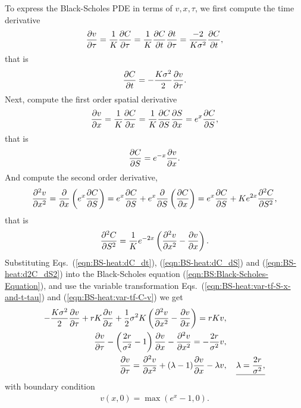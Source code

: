 \documentclass{book}
\begin{document}
To express the Black-Scholes PDE in terms of $v, x, \tau$, we first compute the time derivative
\begin{align*}
    \pdv{v}{\tau} = \frac{1}{K}\pdv{C}{\tau} 
    = \frac{1}{K}\pdv{C}{t}\pdv{t}{\tau}
    = \frac{-2}{K\sigma^2}\pdv{C}{t},
\end{align*}
that is 
\begin{align}
    \label{eqn:BS-heat:dC_dt}
    \pdv{C}{t} = -\frac{K\sigma^2}{2} \pdv{v}{\tau}.
\end{align}
Next, compute the first order spatial derivative
\begin{align*}
    \pdv{v}{x} = \frac{1}{K} \pdv{C}{x}
    = \frac{1}{K} \pdv{C}{S}\pdv{S}{x}
    = e^{x} \pdv{C}{S},
\end{align*}
that is
\begin{align}
    \label{eqn:BS-heat:dC_dS}
    \pdv{C}{S} = e^{-x} \pdv{v}{x}.
\end{align}
And compute the second order derivative,
\begin{align*}
    \pdv[2]{v}{x} = \pdv{}{x}\left(e^{x} \pdv{C}{S}\right)
    = e^{x}\pdv{C}{S} + e^{x} \pdv{}{S}\left( \pdv{C}{x} \right)
    = e^{x}\pdv{C}{S} + K e^{2x} \pdv[2]{C}{S},
\end{align*}
that is 
\begin{align}
    \label{eqn:BS-heat:d2C_dS2}
    \pdv[2]{C}{S} = \frac{1}{K}e^{-2x}\left(\pdv[2]{v}{x} - \pdv{v}{x}\right).
\end{align}
Substituting Eqs.~(\ref{eqn:BS-heat:dC_dt}), (\ref{eqn:BS-heat:dC_dS}) and (\ref{eqn:BS-heat:d2C_dS2}) into the Black-Scholes equation (\ref{eqn:BS:Black-Scholes-Equation}), and use the variable transformation Eqs.~(\ref{eqn:BS-heat:var-tf-S-x-and-t-tau}) and (\ref{eqn:BS-heat:var-tf-C-v}) we get
\begin{align}
    -\frac{K\sigma^2}{2} \pdv{v}{\tau} + r K \pdv{v}{x} +\frac{1}{2}\sigma^2 K\left(\pdv[2]{v}{x} - \pdv{v}{x}\right) = rKv &, \notag\\
    \pdv{v}{\tau} - \left(\frac{2r}{\sigma^2} - 1\right)  \pdv{v}{x} - \pdv[2]{v}{x} = - \frac{2r}{\sigma^2}v &, \notag\\
    \label{eqn:BS-heat:PDE-of-v}
    \pdv{v}{\tau} = \pdv[2]{v}{x} + (\lambda - 1) \pdv{v}{x} - \lambda v &, \quad \underline{\lambda = \frac{2r}{\sigma^2},}
\end{align}
with boundary condition
\begin{align}
    v(x,0) = \max(e^{x} - 1, 0).
\end{align}
\end{document}
